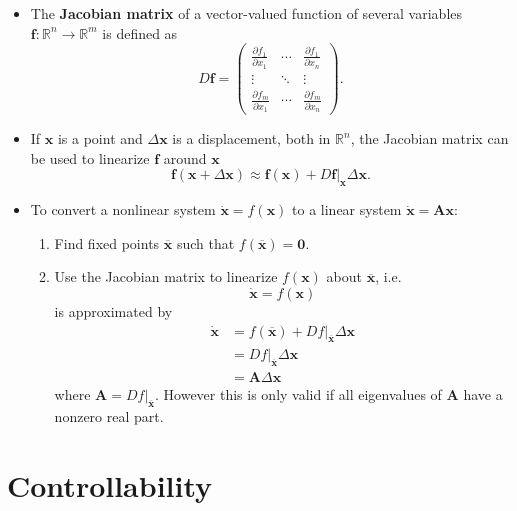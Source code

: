 \documentclass{article}
\renewcommand{\vec}[1]{\boldsymbol{\mathbf{#1}}}
\newcommand{\dvec}[1]{\dot{\vec{#1}}}
\begin{document}
\begin{itemize}
  \item The \textbf{Jacobian matrix} of a vector-valued function of several variables $\vec{f} : \mathbb{R}^n \rightarrow \mathbb{R}^m$ is defined as \[D \vec{f} = \begin{pmatrix}
            \frac{\partial f_1}{\partial x_1} & \cdots & \frac{\partial f_1}{\partial x_n} \\
            \vdots                            & \ddots & \vdots                            \\
            \frac{\partial f_m}{\partial x_1} & \cdots & \frac{\partial f_m}{\partial x_n}
          \end{pmatrix}.\]

  \item If $\vec{x}$ is a point and $\Delta \vec{x}$ is a displacement, both in $\mathbb{R}^n$, the Jacobian matrix can be used to linearize $\vec{f}$ around $\vec{x}$ \[\vec{f}(\vec{x} + \Delta \vec{x}) \approx \vec{f}(\vec{x}) + D \vec{f}|_{\vec{x}} \Delta \vec{x}.\]

  \item To convert a nonlinear system $\dvec{x} = f(\vec{x})$ to a linear system $\dvec{x} = \vec{A} \vec{x}$:

        \begin{enumerate}
          \item Find fixed points $\overline{\vec{x}}$ such that $f(\overline{\vec{x}}) = \vec{0}$.

          \item Use the Jacobian matrix to linearize $f(\vec{x})$ about $\overline{\vec{x}}$, i.e. \[\dvec{x} = f(\vec{x})\] is approximated by \begin{align*}
                  \dvec{x} & = f(\overline{\vec{x}}) + D f|_{\overline{\vec{x}}} \Delta \vec{x} \\
                           & = D f|_{\overline{\vec{x}}} \Delta \vec{x}                         \\
                           & = \vec{A} \Delta \vec{x}
                \end{align*} where $\vec{A} = D f|_{\overline{\vec{x}}}$. However this is only valid if all eigenvalues of $\vec{A}$ have a nonzero real part.
        \end{enumerate}
\end{itemize}

\section{Controllability}
\end{document}
